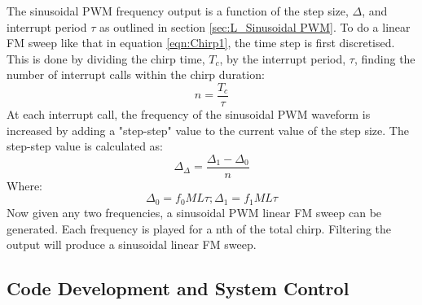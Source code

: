 The sinusoidal PWM frequency output is a function of the step size, $\Delta$, and interrupt period $\tau$ as outlined in section \ref{sec:L_Sinusoidal PWM}. To do a linear FM sweep like that in equation \ref{eqn:Chirp1}, the time step is first discretised. This is done by dividing the chirp time, $T_c$, by the interrupt period, $\tau$, finding the number of interrupt calls within the chirp duration: \\
\begin{equation}
	n = \frac{T_c}{\tau}
\end{equation}
At each interrupt call, the frequency of the sinusoidal PWM waveform is increased by adding a "step-step" value to the current value of the step size. The step-step value is calculated as:
\begin{equation}
	\Delta_\Delta = \frac{\Delta_1 - \Delta_0}{n} 
\end{equation}
Where:
\begin{equation*}
	\Delta_0 = f_0ML\tau; \Delta_1 = f_1ML\tau
\end{equation*}
Now given any two frequencies, a sinusoidal PWM linear FM sweep can be generated. Each frequency is played for a nth of the total chirp. Filtering the output will produce a sinusoidal linear FM sweep. \\



\subsection{Code Development and System Control}
